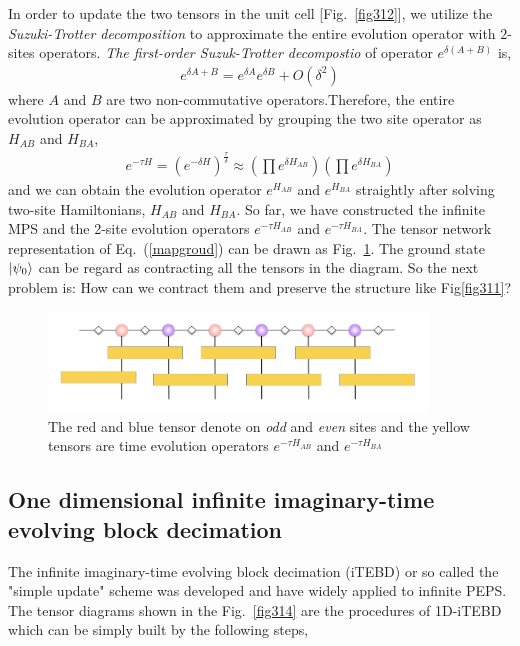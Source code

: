 In order to update the two tensors in the unit cell [Fig.~\ref{fig312}], we utilize the \textit{Suzuki-Trotter decomposition} to approximate the entire evolution operator with $2$-sites operators. \textit{The first-order Suzuk-Trotter decompostio} of operator $e^{\delta (A+B)}$ is,
\begin{align}
	\label{STd}
	e^{\delta A + B} = e^{\delta A}e^{\delta B} + O(\delta^2)
\end{align}
where $A$ and $B$ are two non-commutative operators.Therefore, the entire evolution operator can be approximated by grouping the two site operator as $H_{AB}$ and $H_{BA}$,
\begin{align}
	\label{evoopt}
	e^{-\tau H} = \left(e^{-\delta H}\right)^{\frac{\tau}{\delta}} \approx \left(\prod e^{\delta H_{AB}} \right)\left( \prod e^{\delta H_{BA}}\right)
\end{align}
and we can obtain the evolution operator $e^{H_{AB}}$ and $e^{H_{BA}}$ straightly after solving two-site Hamiltonians, $H_{AB}$ and $H_{BA}$.
So far, we have constructed the infinite MPS and the 2-site evolution operators $e^{-\tau H_{AB}}$ and $e^{-\tau H_{BA}}$. The tensor network representation of Eq.~(\ref{mapgroud}) can be drawn as Fig.~\ref{fig313}. The ground state $\Ket{\psi_0}$ can be regard as contracting all the tensors in the diagram. So the next problem is: How can we contract them and preserve the structure like Fig{\ref{fig311}}?

\begin{figure}[ht]
	\centering
	\includegraphics[width=0.90\textwidth]{figures/fig312.png}
	\caption[The tensor diagram of imaginary time evolving block decimation.]{The red and blue tensor denote on \textit{odd} and \textit{even} sites and the yellow tensors are time evolution operators $e^{-\tau H_{AB}}$ and $e^{-\tau H_{BA}}$}
	\label{fig313}
\end{figure}

\subsection{One dimensional infinite imaginary-time evolving block decimation}
\label{itebd}
The infinite imaginary-time evolving block decimation (iTEBD) \cite{PhysRevLett.98.070201, PhysRevB.78.155117} or so called the "simple update" scheme was developed and have widely applied to infinite PEPS. The tensor diagrams shown in the Fig.~\ref{fig314} are the procedures of 1D-iTEBD which can be simply built by the following steps,

